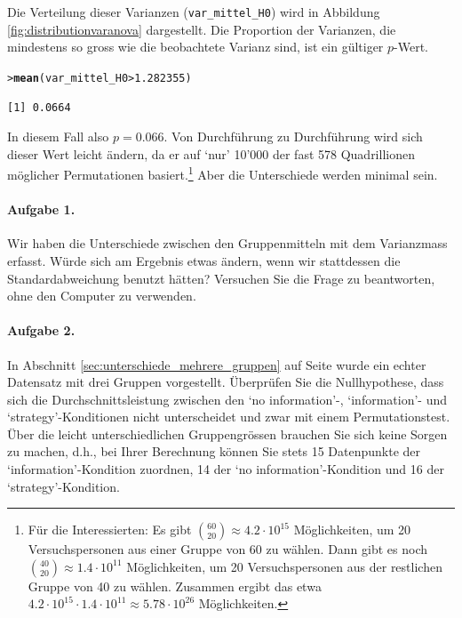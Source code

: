 \documentclass[oneside, 10pt]{book}\usepackage[]{graphicx}\usepackage[]{xcolor}
\makeatletter
\newcommand{\hlnum}[1]{\textcolor[rgb]{0.686,0.059,0.569}{#1}}%
\newcommand{\hlopt}[1]{\textcolor[rgb]{0,0,0}{#1}}%
\newcommand{\hlstd}[1]{\textcolor[rgb]{0.345,0.345,0.345}{#1}}%
\newcommand{\hlkwd}[1]{\textcolor[rgb]{0.737,0.353,0.396}{\textbf{#1}}}%
\newenvironment{kframe}{%
 \def\at@end@of@kframe{}%
 \ifinner\ifhmode%
  \def\at@end@of@kframe{\end{minipage}}%
  \begin{minipage}{\columnwidth}%
 \fi\fi%
 \def\FrameCommand##1{\hskip\@totalleftmargin \hskip-\fboxsep
 \colorbox{shadecolor}{##1}\hskip-\fboxsep
     \hskip-\linewidth \hskip-\@totalleftmargin \hskip\columnwidth}%
 \MakeFramed {\advance\hsize-\width
   \@totalleftmargin\z@ \linewidth\hsize
   \@setminipage}}%
 {\par\unskip\endMakeFramed%
 \at@end@of@kframe}
\newenvironment{knitrout}{}{} %
\makeatother
\begin{document}
Die Verteilung dieser Varianzen (\texttt{var\_mittel\_H0})
wird in Abbildung \ref{fig:distributionvaranova} dargestellt.
Die Proportion der Varianzen, die mindestens so gross wie die
beobachtete Varianz sind, ist ein gültiger $p$-Wert.
\begin{knitrout}
\color{fgcolor}\begin{kframe}
\begin{alltt}
\hlstd{> }\hlkwd{mean}\hlstd{(var_mittel_H0} \hlopt{>} \hlnum{1.282355}\hlstd{)}
\end{alltt}
\begin{verbatim}
[1] 0.0664
\end{verbatim}
\end{kframe}
\end{knitrout}

In diesem Fall also $p = 0.066$.
Von Durchführung zu Durchführung wird sich dieser Wert
leicht ändern, da er auf `nur' 10'000 der fast
578 Quadrillionen möglicher Permutationen basiert.\footnote{Für die Interessierten:
Es gibt ${{60}\choose{20}} \approx 4.2 \cdot 10^{15}$ Möglichkeiten, um 20 Versuchspersonen
aus einer Gruppe von 60 zu wählen. Dann gibt es noch ${{40}\choose{20}} \approx 1.4 \cdot 10^{11}$ Möglichkeiten,
um 20 Versuchspersonen aus der restlichen Gruppe von 40 zu wählen. Zusammen ergibt das etwa
$4.2 \cdot 10^{15} \cdot 1.4 \cdot 10^{11} \approx 5.78 \cdot 10^{26}$ Möglichkeiten.}
Aber die Unterschiede werden minimal sein.

\paragraph{Aufgabe 1.} 
Wir haben die Unterschiede zwischen den Gruppenmitteln
mit dem Varianzmass erfasst. Würde sich am Ergebnis etwas ändern, wenn wir
stattdessen die Standardabweichung benutzt hätten? Versuchen Sie die Frage zu beantworten,
ohne den Computer zu verwenden.

\paragraph{Aufgabe 2.}
In Abschnitt \ref{sec:unterschiede_mehrere_gruppen} auf
Seite \pageref{sec:unterschiede_mehrere_gruppen} wurde
ein echter Datensatz mit drei Gruppen vorgestellt.
Überprüfen Sie die Nullhypothese, dass sich die
Durchschnittsleistung zwischen den `no information'-,
`information'- und `strategy'-Konditionen nicht unterscheidet
und zwar mit einem Permutationstest.
Über die leicht unterschiedlichen
Gruppengrössen brauchen Sie sich keine Sorgen zu machen, d.h., bei Ihrer Berechnung
können Sie stets 15 Datenpunkte der `information'-Kondition zuordnen,
14 der `no information'-Kondition und 16 der `strategy'-Kondition.
\end{document}
